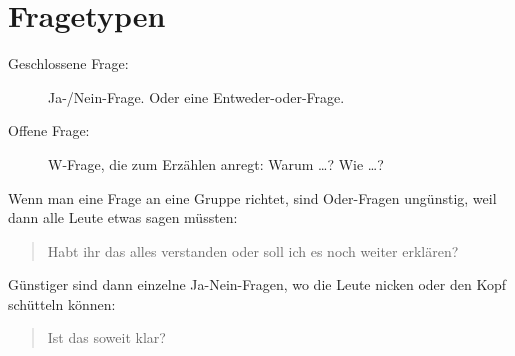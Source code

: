 \section{Fragetypen}
\begin{description}
\item[Geschlossene Frage:] Ja-/Nein-Frage. Oder eine Entweder-oder-Frage.
\item[Offene Frage:] W-Frage, die zum Erzählen anregt: Warum \ldots? Wie \ldots?
\end{description}

Wenn man eine Frage an eine Gruppe richtet, sind Oder-Fragen ungünstig, weil dann alle Leute etwas sagen müssten:

\begin{quotation}
Habt ihr das alles verstanden oder soll ich es noch weiter erklären?
\end{quotation}

Günstiger sind dann einzelne Ja-Nein-Fragen, wo die Leute nicken oder den Kopf schütteln können:

\begin{quotation}
Ist das soweit klar?
\end{quotation}
 